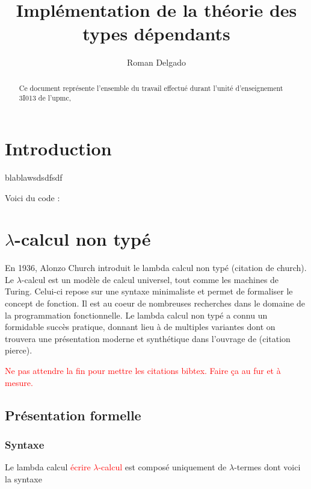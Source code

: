 \documentclass {article}
\title{Implémentation de la théorie des types dépendants}
\author{Roman Delgado}
\date{}
\newcommand{\codefrom}[3]
           {}
\theoremstyle{definition}
\theoremstyle{remark}
\newcommand{\todo}[1]{\textcolor{red}{#1}}
\begin{document}
\maketitle




\begin{abstract} 
  Ce document représente l'ensemble du travail effectué durant l'unité d'enseignement 3I013 de l'upmc,
\end{abstract}

\tableofcontents

\clearpage


\section{Introduction}

blablawsdsdfsdf


Voici du code :


\section{$\lambda$-calcul non typé}

En 1936, Alonzo Church introduit le lambda calcul non typé
(citation de church). Le $\lambda$-calcul est
un modèle de calcul universel, tout comme les machines de Turing. Celui-ci repose
sur une syntaxe minimaliste et permet de formaliser le concept de fonction. Il est au coeur de nombreuses recherches dans le domaine de la 
programmation fonctionnelle. Le lambda calcul non typé a connu un formidable 
succès pratique, donnant lieu à de multiples variantes dont on trouvera une présentation
 moderne et synthétique dans l'ouvrage de (citation pierce).

\todo{Ne pas attendre la fin pour mettre les citations bibtex. Faire ça au fur et à mesure.}

\subsection{Présentation formelle}

\subsubsection{Syntaxe}
Le lambda calcul \todo{écrire $\lambda$-calcul} est composé uniquement de \(\lambda\)-termes dont voici la syntaxe
\end{document}
